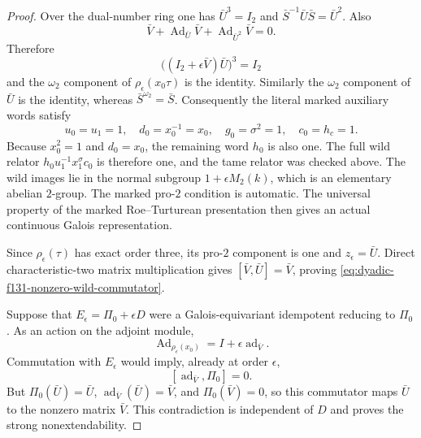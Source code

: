 \documentclass[11pt]{article}
\theoremstyle{definition}
\begin{document}
\begin{proof}
Over the dual-number ring
one has
$\bar U^3=I_2$ and
$\bar S^{-1}\bar U\bar S
=\bar U^2$.
Also
\[
\bar V+\operatorname{Ad}_{\bar U}\bar V
+\operatorname{Ad}_{\bar U^2}\bar V=0.
\]
Therefore
\[
\bigl((I_2+\epsilon\bar V)\bar U\bigr)^3
=I_2
\]
and the $\omega_2$
component of
$\rho_\epsilon(x_0\tau)$
is the identity.
Similarly the
$\omega_2$ component
of $\bar U$ is the
identity, whereas
$\bar S^{\omega_2}=\bar S$.
Consequently the literal
marked auxiliary words
satisfy
\[
u_0=u_1=1,\quad
d_0=x_0^{-1}=x_0,\quad
g_0=\sigma^2=1,\quad
c_0=h_c=1.
\]
Because $x_0^2=1$ and
$d_0=x_0$, the remaining
word $h_0$ is also one.
The full wild relator
$h_0u_1^{-1}x_1^\sigma c_0$
is therefore one, and the
tame relator was checked
above.
The wild images lie in the
normal subgroup
$1+\epsilon M_2(k)$,
which is an elementary
abelian $2$-group.
The marked pro-$2$
condition is automatic.
The universal property
of the marked
Roe--Turturean presentation
then gives an actual
continuous Galois
representation.

Since $\rho_\epsilon(\tau)$
has exact order three,
its pro-$2$ component
is one and
$z_\epsilon=\bar U$.
Direct characteristic-two
matrix multiplication gives
$[\bar V,\bar U]=\bar V$,
proving
\eqref{eq:dyadic-f131-nonzero-wild-commutator}.

Suppose that
$E_\epsilon=\Pi_0+\epsilon D$
were a Galois-equivariant
idempotent reducing to
$\Pi_0$.
As an action on the
adjoint module,
\[
\operatorname{Ad}_{\rho_\epsilon(x_0)}
=I+\epsilon\operatorname{ad}_{\bar V}.
\]
Commutation with $E_\epsilon$
would imply, already
at order $\epsilon$,
\[
[\operatorname{ad}_{\bar V},\Pi_0]=0.
\]
But $\Pi_0(\bar U)=\bar U$,
$\operatorname{ad}_{\bar V}(\bar U)=\bar V$,
and $\Pi_0(\bar V)=0$,
so this commutator maps
$\bar U$ to the nonzero
matrix $\bar V$.
This contradiction is
independent of $D$ and
proves the strong
nonextendability.
\end{proof}
\end{document}
